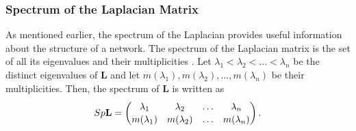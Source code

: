 \documentclass[10pt,a4paper]{article}
\begin{document}
\subsubsection{Spectrum of the Laplacian Matrix}
As mentioned earlier, the spectrum of the Laplacian provides useful information about the structure of a network. The spectrum of the Laplacian matrix is the set of all its eigenvalues and their multiplicities \citep{estrada2011structure}. Let $\lambda_1 < \lambda_2 < \ldots < \lambda_n$ be the distinct eigenvalues of $\mathbf{L}$ and let $m(\lambda_1),m(\lambda_2), \ldots,m(\lambda_n)$ be their multiplicities. Then, the spectrum of $\mathbf{L}$ is written as
\begin{eqnarray}
Sp\mathbf{L} = 
\renewcommand*{\arraystretch}{1.1}
\begin{pmatrix*}
\lambda_1 & \lambda_2 & \ldots & \lambda_n \\
m(\lambda_1) & m(\lambda_2) & \ldots & m(\lambda_n)
\end{pmatrix*}.
\end{eqnarray}
\end{document}
